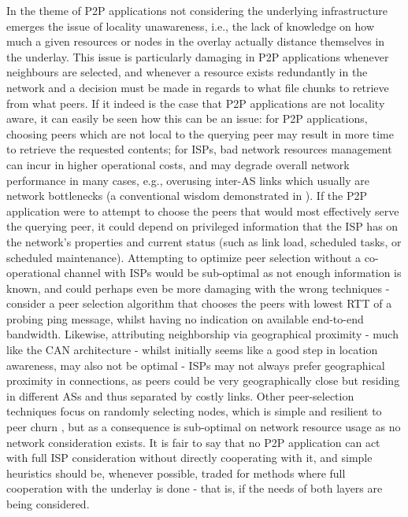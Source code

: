     In the theme of P2P applications not considering the underlying infrastructure emerges the issue of locality unawareness, i.e., the lack of knowledge on how much a given resources or nodes in the overlay actually distance themselves in the underlay.
    This issue is particularly damaging in P2P applications whenever neighbours are selected, and whenever a resource exists redundantly in the network and a decision must be made in regards to what file chunks to retrieve from what peers.
    If it indeed is the case that P2P applications are not locality aware, it can easily be seen how this can be an issue: for P2P applications, choosing peers which are not local to the querying peer may result in more time to retrieve the requested contents; for ISPs, bad network resources management can incur in higher operational costs, and may degrade overall network performance in many cases, e.g., overusing inter-AS links which usually are network bottlenecks (a conventional wisdom demonstrated in \cite{akella}).
    If the P2P application were to attempt to choose the peers that would most effectively serve the querying peer, it could depend on privileged information that the ISP has on the network's properties and current status (such as link load, scheduled tasks, or scheduled maintenance).
    Attempting to optimize peer selection without a co-operational channel with ISPs would be sub-optimal as not enough information is known, and could perhaps even be more damaging with the wrong techniques - consider a peer selection algorithm that chooses the peers with lowest RTT of a probing ping message, whilst having no indication on available end-to-end bandwidth.
    Likewise, attributing neighborship via geographical proximity - much like the CAN architecture - whilst initially seems like a good step in location awareness, may also not be optimal - ISPs may not always prefer geographical proximity in connections, as peers could be very geographically close but residing in different ASs and thus separated by costly links.
    Other peer-selection techniques focus on randomly selecting nodes, which is simple and resilient to peer churn \cite{qin2009}, but as a consequence is sub-optimal on network resource usage as no network consideration exists.
    It is fair to say that no P2P application can act with full ISP consideration without directly cooperating with it, and simple heuristics should be, whenever possible, traded for methods where full cooperation with the underlay is done - that is, if the needs of both layers are being considered.

